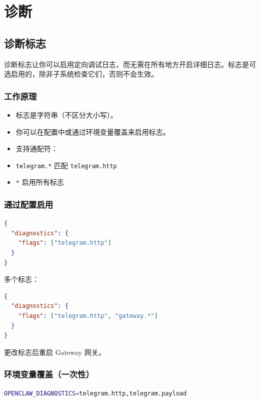 \chapter{诊断}

\section{诊断标志}


诊断标志让你可以启用定向调试日志，而无需在所有地方开启详细日志。标志是可选启用的，除非子系统检查它们，否则不会生效。

\subsection{工作原理}


\begin{itemize}
  \item 标志是字符串（不区分大小写）。
  \item 你可以在配置中或通过环境变量覆盖来启用标志。
  \item 支持通配符：
  \item \texttt{telegram.*} 匹配 \texttt{telegram.http}
  \item \texttt{*} 启用所有标志
\end{itemize}


\subsection{通过配置启用}


\begin{lstlisting}[language=json]
{
  "diagnostics": {
    "flags": ["telegram.http"]
  }
}
\end{lstlisting}


多个标志：

\begin{lstlisting}[language=json]
{
  "diagnostics": {
    "flags": ["telegram.http", "gateway.*"]
  }
}
\end{lstlisting}


更改标志后重启 Gateway 网关。

\subsection{环境变量覆盖（一次性）}


\begin{lstlisting}[language=bash]
OPENCLAW_DIAGNOSTICS=telegram.http,telegram.payload
\end{lstlisting}


